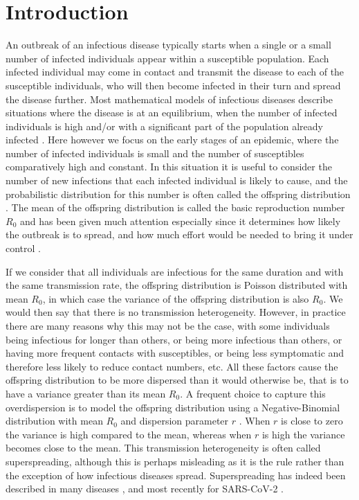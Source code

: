 \documentclass{article}
\begin{document}
\newpage
\section{Introduction}

An outbreak of an infectious disease typically starts when a single or a small number
of infected individuals appear within a susceptible population. Each infected individual
may come in contact and transmit the disease to each of the susceptible individuals, who will then
become infected in their turn and spread the disease further. Most mathematical models of infectious diseases
describe situations where the disease is at an equilibrium, when the number
of infected individuals is high and/or with a significant part of the population already infected
\citep{Anderson1991,keeling2008modeling}. 
Here however we focus on the early stages of an epidemic, where the number of 
infected individuals is small and the number of susceptibles comparatively high and constant.
In this situation it is useful to consider the number of new infections that each infected
individual is likely to cause, and the probabilistic distribution for this number is often called
the offspring distribution \citep{Grassly2008}. 
The mean of the offspring distribution is called the basic
reproduction number $R_0$ and has been given much attention especially since
it determines how likely the outbreak is to spread, and how much effort would be needed
to bring it under control \citep{fraserFactorsThatMake2004,fergusonStrategiesMitigatingInfluenza2006}. 

If we consider that all
individuals are infectious for the same duration and with the same transmission rate,
the offspring distribution is Poisson distributed with mean $R_0$, in which case the variance
of the offspring distribution is also $R_0$. We would then say that there is no transmission
heterogeneity. However, in practice there are many reasons why this may not be the case,
with some individuals being infectious for longer than others, or being more infectious than others, or 
having more frequent contacts with susceptibles, or being less symptomatic and therefore less likely
to reduce contact numbers, etc. All these factors cause the offspring distribution to be more 
dispersed than it would otherwise be, that is to have a variance greater than its mean $R_0$. 
A frequent choice to capture this overdispersion is to model the offspring distribution
using a Negative-Binomial distribution with mean $R_0$ and dispersion parameter $r$
\citep{Lloyd-Smith2005,Grassly2008}. When $r$ is close to zero the variance is high compared to the mean,
whereas when $r$ is high the variance becomes close to the mean. This transmission heterogeneity
is often called superspreading, although this is perhaps misleading
as it is the rule rather than the exception of how infectious diseases spread. Superspreading has
indeed been described in many diseases \citep{woolhouseHeterogeneitiesTransmissionInfectious1997,
steinSuperspreadersInfectiousDiseases2011,kucharskiRoleSuperspreadingMiddle2015,
wangSuperspreadingHeterogeneityTransmission2021}, 
and most recently for 
SARS-CoV-2 \citep{Wang2020,lemieuxPhylogeneticAnalysisSARSCoV22021,gomez-carballaSuperspreadingEmergenceCOVID192021,duSystematicReviewMetaanalyses2022}.
\end{document}
